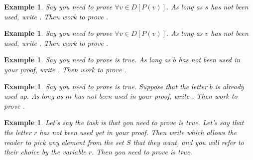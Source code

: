 \documentclass{book}
\newcounter{ekcounter}%
\theoremstyle{ekimcustom}
\newtheorem{example}[ekcounter]{Example}
\begin{document}
\begin{example}
Say you need to prove $\forall v \in D [P(v)]$. As long as $s$ has not been used, write . Then work to prove .
\end{example}
\begin{example}
Say you need to prove $\forall v \in D [P(v)]$. As long as $v$ has not been used, write . Then work to prove .
\end{example}
\begin{example}
Say you need to prove  is true. As long as $b$ has not been used in your proof, write . Then work to prove .
\end{example}
\begin{example}
Say you need to prove  is true. Suppose that the letter $b$ is already used up. As long as $m$ has not been used in your proof, write . Then work to prove .
\end{example}
\begin{example}
Let's say the task is that you need to prove  is true. Let's say that the letter $r$ has not been used yet in your proof. Then write  which allows the reader to pick any element from the set $S$ that they want, and you will refer to their choice by the variable $r$. Then you need to prove  is true.
\end{example}
\end{document}
